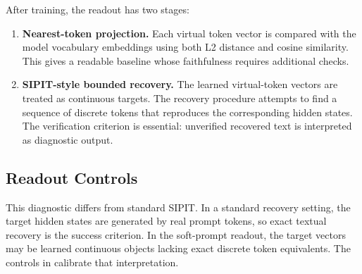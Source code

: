 \documentclass[12pt,a4paper,twoside,openright]{book}
\begin{document}
After training, the readout has two stages:

\begin{enumerate}
    \item \textbf{Nearest-token projection.} Each virtual token vector is
    compared with the model vocabulary embeddings using both L2 distance and
    cosine similarity. This gives a readable baseline whose faithfulness
    requires additional checks.
    \item \textbf{SIPIT-style bounded recovery.} The learned virtual-token
    vectors are treated as continuous targets. The recovery procedure attempts
    to find a sequence of discrete tokens that reproduces the corresponding
    hidden states. The verification criterion is essential: unverified recovered
    text is interpreted as diagnostic output.
\end{enumerate}

\subsection{Readout Controls}
\label{subsec:method-soft-prompt-controls}

This diagnostic differs from standard SIPIT. In a standard recovery setting, the
target hidden states are generated by real prompt tokens, so exact textual
recovery is the success criterion. In the soft-prompt readout, the target
vectors may be learned continuous objects lacking exact discrete token
equivalents. The controls in  calibrate that
interpretation.
\end{document}
